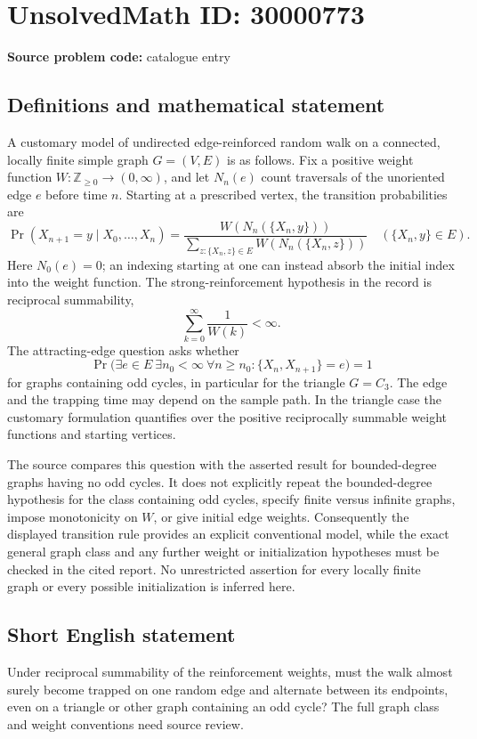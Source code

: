 \documentclass[11pt]{article}
\newcommand{\Z}{\mathbb{Z}}
\begin{document}
\section*{UnsolvedMath ID: 30000773}
\textbf{Source problem code:} catalogue entry
\subsection{Definitions and mathematical statement}
A customary model of undirected edge-reinforced random walk on a connected, locally finite simple graph \(G=(V,E)\) is as follows. Fix a positive weight function \(W:\Z_{\geq0}\to(0,\infty)\), and let \(N_n(e)\) count traversals of the unoriented edge \(e\) before time \(n\). Starting at a prescribed vertex, the transition probabilities are
\[
\Pr(X_{n+1}=y\mid X_0,\ldots,X_n)
=\frac{W(N_n(\{X_n,y\}))}{\sum_{z:\{X_n,z\}\in E}W(N_n(\{X_n,z\}))}
\quad (\{X_n,y\}\in E).
\]
Here \(N_0(e)=0\); an indexing starting at one can instead absorb the initial index into the weight function. The strong-reinforcement hypothesis in the record is reciprocal summability,
\[
\sum_{k=0}^{\infty}\frac1{W(k)}<\infty.
\]
The attracting-edge question asks whether
\[
\Pr\bigl(\exists e\in E\ \exists n_0<\infty\ \forall n\geq n_0:
\{X_n,X_{n+1}\}=e\bigr)=1
\]
for graphs containing odd cycles, in particular for the triangle \(G=C_3\). The edge and the trapping time may depend on the sample path. In the triangle case the customary formulation quantifies over the positive reciprocally summable weight functions and starting vertices.

The source compares this question with the asserted result for bounded-degree graphs having no odd cycles. It does not explicitly repeat the bounded-degree hypothesis for the class containing odd cycles, specify finite versus infinite graphs, impose monotonicity on \(W\), or give initial edge weights. Consequently the displayed transition rule provides an explicit conventional model, while the exact general graph class and any further weight or initialization hypotheses must be checked in the cited report. No unrestricted assertion for every locally finite graph or every possible initialization is inferred here.
\subsection{Short English statement}
Under reciprocal summability of the reinforcement weights, must the walk almost surely become trapped on one random edge and alternate between its endpoints, even on a triangle or other graph containing an odd cycle? The full graph class and weight conventions need source review.
\end{document}
